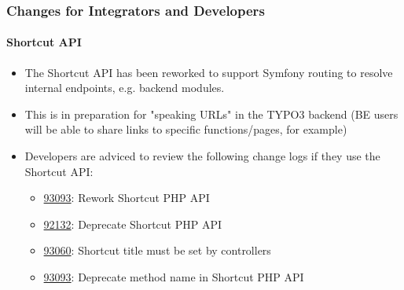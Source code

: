 %

\begin{frame}[fragile]
	\frametitle{Changes for Integrators and Developers}
	\framesubtitle{Shortcut API}

	\begin{itemize}
		\item The Shortcut API has been reworked to support Symfony routing to
			resolve internal endpoints, e.g. backend modules.
		\item This is in preparation for "speaking URLs" in the TYPO3 backend\newline
			\small(BE users will be able to share links to specific functions/pages,
			for example)\normalsize
		\item Developers are adviced to review the following change logs if they
			use the Shortcut API:

			\begin{itemize}
				\item \href{https://docs.typo3.org}{93093}: Rework Shortcut PHP API
				\item \href{https://docs.typo3.org}{92132}: Deprecate Shortcut PHP API
				\item \href{https://docs.typo3.org}{93060}: Shortcut title must be set by controllers
				\item \href{https://docs.typo3.org}{93093}: Deprecate method name in Shortcut PHP API
			\end{itemize}

	\end{itemize}

\end{frame}

